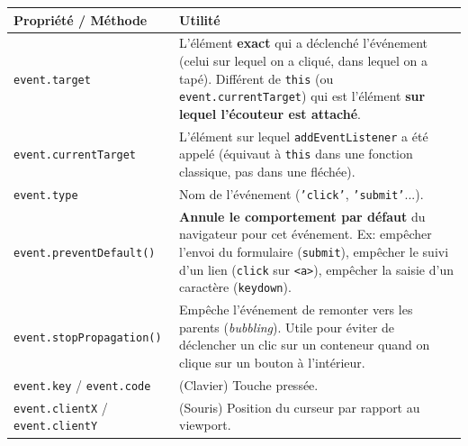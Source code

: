 \documentclass[11pt]{article}
\begin{document}
\begin{propriete}
\begin{center}
\begin{tabularx}{\linewidth}{|l|X|}\hline
\textbf{Propriété / Méthode} & \textbf{Utilité} \\\hline
\texttt{event.target} & L'élément \textbf{exact} qui a déclenché l'événement (celui sur lequel on a cliqué, dans lequel on a tapé). Différent de \texttt{this} (ou \texttt{event.currentTarget}) qui est l'élément \textbf{sur lequel l'écouteur est attaché}. \\\hline
\texttt{event.currentTarget} & L'élément sur lequel \texttt{addEventListener} a été appelé (équivaut à \texttt{this} dans une fonction classique, pas dans une fléchée). \\\hline
\texttt{event.type} & Nom de l'événement (\texttt{'click'}, \texttt{'submit'}...). \\\hline
\texttt{event.preventDefault()} & \textbf{Annule le comportement par défaut} du navigateur pour cet événement. Ex: empêcher l'envoi du formulaire (\texttt{submit}), empêcher le suivi d'un lien (\texttt{click} sur \texttt{<a>}), empêcher la saisie d'un caractère (\texttt{keydown}). \\\hline
\texttt{event.stopPropagation()} & Empêche l'événement de remonter vers les parents (\emph{bubbling}). Utile pour éviter de déclencher un clic sur un conteneur quand on clique sur un bouton à l'intérieur. \\\hline
\texttt{event.key} / \texttt{event.code} & (Clavier) Touche pressée. \\\hline
\texttt{event.clientX} / \texttt{event.clientY} & (Souris) Position du curseur par rapport au viewport. \\\hline
\end{tabularx}
\end{center}
\end{propriete}
\end{document}
